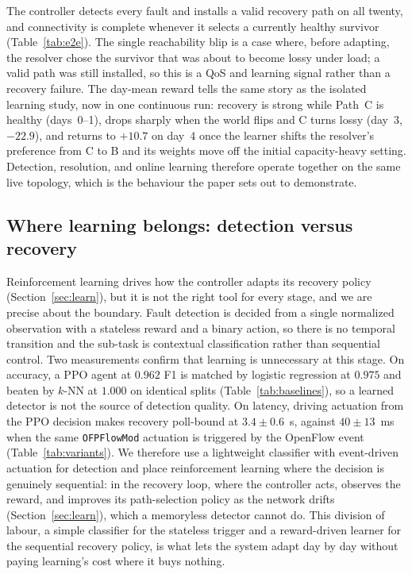 \documentclass[conference]{IEEEtran}
\begin{document}
The controller detects every fault and installs a valid recovery path on all twenty,
and connectivity is complete whenever it selects a currently healthy survivor
(Table~\ref{tab:e2e}). The single reachability blip is a case where, before adapting,
the resolver chose the survivor that was about to become lossy under load; a valid
path was still installed, so this is a QoS and learning signal rather than a recovery
failure. The day-mean reward tells the same story as the isolated learning study, now
in one continuous run: recovery is strong while Path~C is healthy (days~0--1), drops
sharply when the world flips and C turns lossy (day~3, $-22.9$), and returns to
$+10.7$ on day~4 once the learner shifts the resolver's preference from C to B and its
weights move off the initial capacity-heavy setting. Detection, resolution, and online
learning therefore operate together on the same live topology, which is the behaviour
the paper sets out to demonstrate.

\subsection{Where learning belongs: detection versus recovery}
\label{sec:ablation}
Reinforcement learning drives how the controller adapts its recovery policy
(Section~\ref{sec:learn}), but it is not the right tool for every stage, and we are
precise about the boundary. Fault detection is decided from a single normalized
observation with a stateless reward and a binary action, so there is no temporal
transition and the sub-task is contextual classification rather than sequential
control. Two measurements confirm that learning is unnecessary at this stage. On
accuracy, a PPO agent at $0.962$ F1 is matched by logistic regression at $0.975$ and
beaten by $k$-NN at $1.000$ on identical splits (Table~\ref{tab:baselines}), so a
learned detector is not the source of detection quality. On latency, driving actuation
from the PPO decision makes recovery poll-bound at $3.4\pm0.6$~s, against $40\pm13$~ms
when the same \texttt{OFPFlowMod} actuation is triggered by the OpenFlow event
(Table~\ref{tab:variants}). We therefore use a lightweight classifier with
event-driven actuation for detection and place reinforcement learning where the
decision is genuinely sequential: in the recovery loop, where the controller acts,
observes the reward, and improves its path-selection policy as the network drifts
(Section~\ref{sec:learn}), which a memoryless detector cannot do. This division of
labour, a simple classifier for the stateless trigger and a reward-driven learner for
the sequential recovery policy, is what lets the system adapt day by day without
paying learning's cost where it buys nothing.
\end{document}
